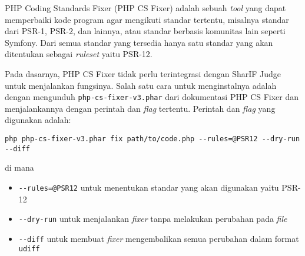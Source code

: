 PHP Coding Standards Fixer (PHP CS Fixer) \cite{PHP_CS_Fixer} adalah sebuah \textit{tool} yang dapat memperbaiki kode program agar mengikuti standar tertentu, misalnya standar dari PSR-1, PSR-2, dan lainnya, atau standar berbasis komunitas lain seperti Symfony. Dari semua standar yang tersedia hanya satu standar yang akan ditentukan sebagai \textit{ruleset} yaitu PSR-12. 

Pada dasarnya, PHP CS Fixer tidak perlu terintegrasi dengan SharIF Judge untuk menjalankan fungsinya. Salah satu cara untuk menginstalnya adalah dengan mengunduh \verb|php-cs-fixer-v3.phar| dari dokumentasi PHP CS Fixer dan menjalankannya dengan perintah dan \textit{flag} tertentu. Perintah dan \textit{flag} yang digunakan adalah:
\begin{lstlisting}[basicstyle=\ttfamily, frame=single,
	columns=fullflexible, keepspaces=true, breaklines=true, label=ls:1]
	php php-cs-fixer-v3.phar fix path/to/code.php --rules=@PSR12 --dry-run --diff
\end{lstlisting}
di mana
\begin{itemize}
	\item \verb|--rules=@PSR12| untuk menentukan standar yang akan digunakan yaitu PSR-12
	\item \verb|--dry-run| untuk menjalankan \textit{fixer} tanpa melakukan perubahan pada \textit{file}
	\item \verb|--diff| untuk membuat \textit{fixer} mengembalikan semua perubahan dalam format \verb|udiff|
\end{itemize}


